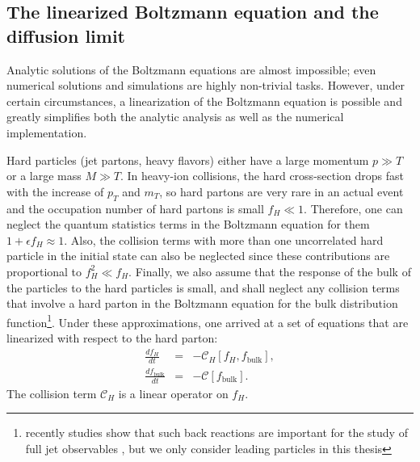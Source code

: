 \subsection{The linearized Boltzmann equation and the diffusion limit}
Analytic solutions of the Boltzmann equations are almost impossible; even numerical solutions and simulations are highly non-trivial tasks.
However, under certain circumstances, a linearization of the Boltzmann equation is possible and greatly simplifies both the analytic analysis as well as the numerical implementation.

Hard particles (jet partons, heavy flavors) either have a large momentum $p\gg T$ or a large mass $M \gg T$. 
In heavy-ion collisions, the hard cross-section drops fast with the increase of $p_T$ and $m_T$, so hard partons are very rare in an actual event and the occupation number of hard partons is small $f_H \ll 1$.
Therefore, one can neglect the quantum statistics terms in the Boltzmann equation for them $1+\epsilon f_H \approx 1$.
Also, the collision terms with more than one uncorrelated hard particle in the initial state can also be neglected since these contributions are proportional to $f_H^2 \ll f_H$. 
Finally, we also assume that the response of the bulk of the particles to the hard particles is small, and shall neglect any collision terms that involve a hard parton in the Boltzmann equation for the bulk distribution function\footnote{\singlespacing recently studies show that such back reactions are important for the study of full jet observables \cite{PhysRevC.99.054911}, but we only consider leading particles in this thesis}.
Under these approximations, one arrived at a set of equations that are linearized with respect to the hard parton:
\begin{eqnarray}
\frac{df_H}{dt} &=& -\mathcal{C}_H[f_H, f_{\textrm{bulk}}], \label{eq:hard-bulk-eq}\\
\frac{df_{\textrm{bulk}}}{dt} &=& -\mathcal{C}[f_{\textrm{bulk}}].
\end{eqnarray}
The collision term $\mathcal{C}_H$ is a linear operator on $f_H$.

